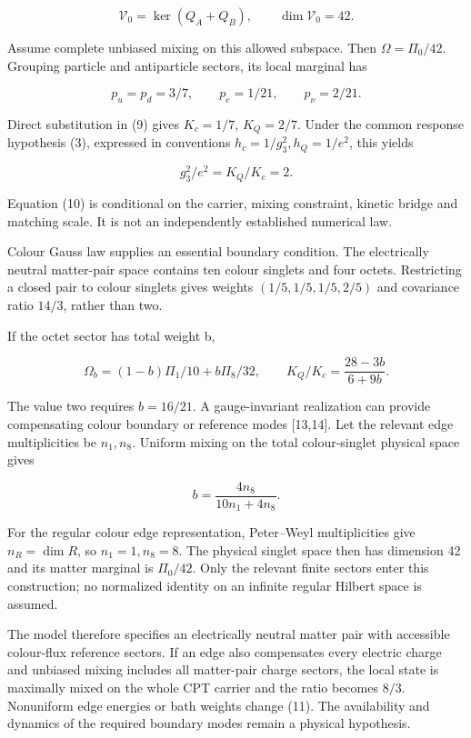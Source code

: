 \documentclass[
  11pt,
  a4paper,
]{article}
\begin{document}
\[
 \mathcal V_0=\ker(Q_A+Q_B),\qquad \dim\mathcal V_0=42.
\]

Assume complete unbiased mixing on this allowed subspace. Then \(\Omega=\Pi_0/42\). Grouping particle and antiparticle sectors, its local marginal has

\[
 p_u=p_d=3/7,\qquad p_e=1/21,\qquad p_\nu=2/21.
\]

Direct substitution in (9) gives \(K_c=1/7\), \(K_Q=2/7\). Under the common response hypothesis (3), expressed in conventions \(h_c=1/g_3^2,h_Q=1/e^2\), this yields

\[
 g_3^2/e^2=K_Q/K_c=2. \tag{10}
\]

Equation (10) is conditional on the carrier, mixing constraint, kinetic bridge and matching scale. It is not an independently established numerical law.

Colour Gauss law supplies an essential boundary condition. The electrically neutral matter-pair space contains ten colour singlets and four octets. Restricting a closed pair to colour singlets gives weights \((1/5,1/5,1/5,2/5)\) and covariance ratio \(14/3\), rather than two.

If the octet sector has total weight b,

\[
 \Omega_b=(1-b)\Pi_1/10+b\Pi_8/32,\qquad
 K_Q/K_c=\frac{28-3b}{6+9b}. \tag{11}
\]

The value two requires \(b=16/21\). A gauge-invariant realization can provide compensating colour boundary or reference modes {[}13,14{]}. Let the relevant edge multiplicities be \(n_1,n_8\). Uniform mixing on the total colour-singlet physical space gives

\[
 b=\frac{4n_8}{10n_1+4n_8}.
\]

For the regular colour edge representation, Peter--Weyl multiplicities give \(n_R=\dim R\), so \(n_1=1,n_8=8\). The physical singlet space then has dimension 42 and its matter marginal is \(\Pi_0/42\). Only the relevant finite sectors enter this construction; no normalized identity on an infinite regular Hilbert space is assumed.

The model therefore specifies an electrically neutral matter pair with accessible colour-flux reference sectors. If an edge also compensates every electric charge and unbiased mixing includes all matter-pair charge sectors, the local state is maximally mixed on the whole CPT carrier and the ratio becomes \(8/3\). Nonuniform edge energies or bath weights change (11). The availability and dynamics of the required boundary modes remain a physical hypothesis.
\end{document}

